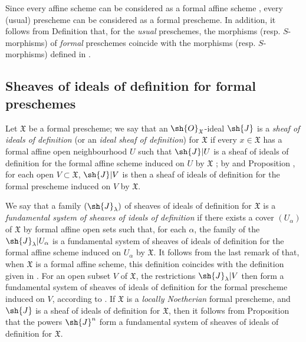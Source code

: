 \begin{env}[10.4.8]
\label{I.10.4.8}
Since every affine scheme can be considered as a formal affine scheme , every (usual) prescheme can be considered as a formal prescheme.
In addition, it follows from Definition  that, for the \emph{usual} preschemes, the morphisms (resp. $S$-morphisms) of \emph{formal} preschemes coincide with the morphisms (resp. $S$-morphisms) defined in .
\end{env}

\subsection{Sheaves of ideals of definition for formal preschemes}
\label{subsection:I.10.5}

\begin{env}[10.5.1]
\label{I.10.5.1}
Let $\mathfrak{X}$ be a formal prescheme; we say that an $\sh{O}_\mathfrak{X}$-ideal $\sh{J}$ is a \emph{sheaf of ideals of definition} (or an \emph{ideal sheaf of definition}) for $\mathfrak{X}$ if every $x\in\mathfrak{X}$ has a formal affine open neighbourhood $U$ such that $\sh{J}|U$ is a sheaf of ideals of definition for the formal affine scheme induced on $U$ by $\mathfrak{X}$ ; by  and Proposition , for each open $V\subset\mathfrak{X}$, $\sh{J}|V$ is then a sheaf of ideals of definition for the formal prescheme induced on $V$ by $\mathfrak{X}$.

We say that a family $(\sh{J}_\lambda)$ of sheaves of ideals of definition for $\mathfrak{X}$ is a \emph{fundamental system}
\emph{of sheaves of ideals of definition} if there exists a cover $(U_\alpha)$ of $\mathfrak{X}$ by formal affine open sets such that, for each $\alpha$, the family of the $\sh{J}_\lambda|U_\alpha$ is a fundamental system of sheaves of ideals of definition  for the formal affine scheme induced on $U_\alpha$ by $\mathfrak{X}$.
It follows from the last remark of  that, when $\mathfrak{X}$ is a formal affine scheme, this definition coincides with the definition given in .
For an open subset $V$ of $\mathfrak{X}$, the restrictions $\sh{J}_\lambda|V$ then form a fundamental system of sheaves of ideals of definition for the formal prescheme induced on $V$, according to .
If $\mathfrak{X}$ is a \emph{locally Noetherian} formal prescheme, and $\sh{J}$ is a sheaf of ideals of definition for $\mathfrak{X}$, then it follows from Proposition  that the powers $\sh{J}^n$ form a fundamental system of sheaves of ideals of definition for $\mathfrak{X}$.
\end{env}

